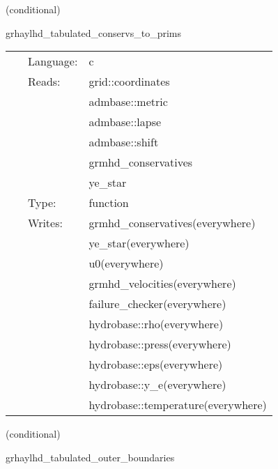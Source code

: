 \documentclass{article}
\begin{document}
\vspace{5mm}

   (conditional) 

\hspace{5mm} grhaylhd\_tabulated\_conservs\_to\_prims 

\hspace{5mm}{\it tabulated version of grhaylhd\_conservs\_to\_prims } 


\hspace{5mm}

 \begin{tabular*}{160mm}{cll} 
~ & Language:  & c \\ 
~ & Reads:  & grid::coordinates \\ 
~& ~ &admbase::metric\\ 
~& ~ &admbase::lapse\\ 
~& ~ &admbase::shift\\ 
~& ~ &grmhd\_conservatives\\ 
~& ~ &ye\_star\\ 
~ & Type:  & function \\ 
~ & Writes:  & grmhd\_conservatives(everywhere) \\ 
~& ~ &ye\_star(everywhere)\\ 
~& ~ &u0(everywhere)\\ 
~& ~ &grmhd\_velocities(everywhere)\\ 
~& ~ &failure\_checker(everywhere)\\ 
~& ~ &hydrobase::rho(everywhere)\\ 
~& ~ &hydrobase::press(everywhere)\\ 
~& ~ &hydrobase::eps(everywhere)\\ 
~& ~ &hydrobase::y\_e(everywhere)\\ 
~& ~ &hydrobase::temperature(everywhere)\\ 
\end{tabular*} 


\vspace{5mm}

   (conditional) 

\hspace{5mm} grhaylhd\_tabulated\_outer\_boundaries 

\hspace{5mm}{\it tabulated version of grhaylhd\_outer\_boundaries } 


\hspace{5mm}
\end{document}

